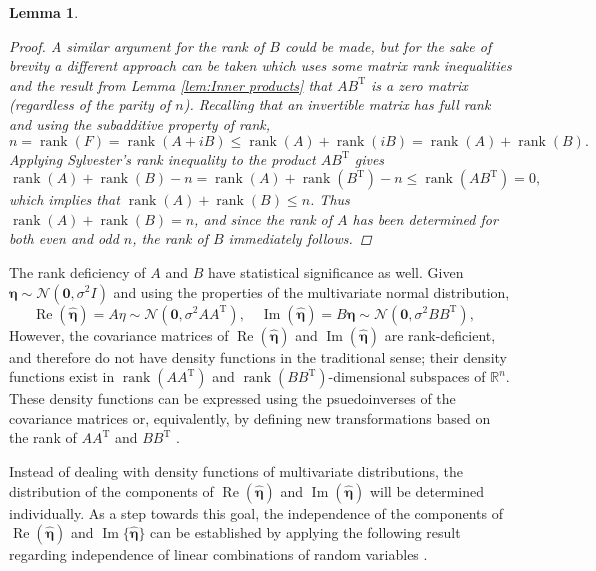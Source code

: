 \documentclass[12pt]{book}
\newcommand{\trans}{\mathrm{T}}	%
\DeclareMathOperator{\rank}{rank}	%
\newcommand{\noise}{\eta}	%
\newcommand{\noiseSD}{\sigma}	%
\newcommand{\noiseVec}{\bm{\noise}}	%
\renewcommand{\Re}{\operatorname{Re}}	%
\renewcommand{\Im}{\operatorname{Im}}	%
\newtheorem{lemma}{Lemma}[section]
\begin{document}
\begin{lemma}
\begin{proof}
A similar argument for the rank of $B$ could be made, but for the sake of brevity a different approach can be taken which uses some matrix rank inequalities and  the result from Lemma \ref{lem:Inner products} that $AB^\trans$ is a zero matrix (regardless of the parity of $n$). Recalling that an invertible matrix has full rank and using the subadditive property of rank,
\[n = \rank(F) = \rank(A + iB) \leq \rank(A) + \rank(iB) = \rank(A) + \rank(B).\] 
Applying Sylvester's rank inequality to the product $AB^\trans$ gives
\[\rank(A) + \rank(B) - n = \rank(A) + \rank(B^\trans) - n \leq \rank(AB^\trans) = 0,\]
which implies that $\rank(A) + \rank(B) \leq n$. Thus $\rank(A) + \rank(B) = n$, and since the rank of $A$ has been determined for both even and odd $n$, the rank of $B$ immediately follows. 
\end{proof}
\end{lemma} 

The rank deficiency of $A$ and $B$ have statistical significance as well.  Given $\noiseVec \sim \mathcal{N}(\bm{0},\noiseSD^2I)$ and using the properties of the multivariate normal distribution, 
\begin{equation}
\Re(\widehat{\noiseVec}) = A\noise \sim \mathcal{N}(\bm{0},\noiseSD^2 AA^\trans), \quad \Im(\widehat{\noiseVec}) = B\noiseVec \sim \mathcal{N}(\bm{0},\noiseSD^2 BB^\trans), \quad
\label{eq:Real and imaginary distributions}
\end{equation}
However, the covariance matrices of $\Re(\widehat{\noiseVec})$ and $\Im(\widehat{\noiseVec})$ are rank-deficient, and therefore do not have density functions in the traditional sense; their density functions exist in $\rank(AA^\trans)$ and $\rank(BB^\trans)$-dimensional subspaces of $\mathbb{R}^n$. These density functions can be expressed using the psuedoinverses of the covariance matrices or, equivalently, by defining new transformations based on the rank of $AA^\trans$ and $BB^\trans$ \cite[p.~527-528]{Rao1973}. \par 
Instead of dealing with density functions of multivariate distributions, the distribution of the components of $\Re(\widehat{\noiseVec})$ and $\Im(\widehat{\noiseVec})$ will be determined individually. As a step towards this goal, the independence of the components of $\Re(\widehat{\noiseVec})$ and $\Im\{\widehat{\noiseVec}\}$ can be established by applying the following result regarding independence of linear combinations of random variables \cite{LukacsKing}.
\end{document}
